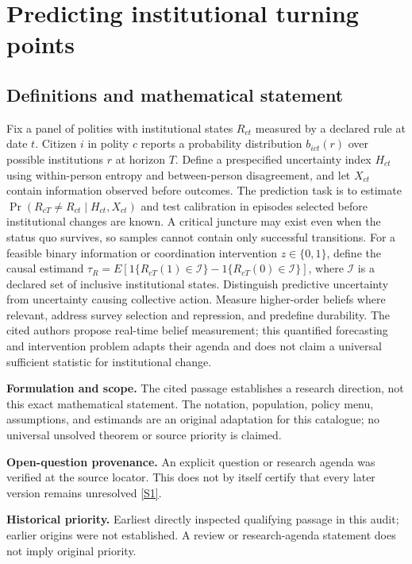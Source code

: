\documentclass[11pt]{article}
\newcommand{\sref}[2]{\hyperlink{source:#1:#2}{[S#2]}}
\begin{document}
\section*{Predicting institutional turning points}\label{30007662}
\subsection{Definitions and mathematical statement}
Fix a panel of polities with institutional states \(R_{ct}\) measured by a declared rule at date \(t\). Citizen \(i\) in polity \(c\) reports a probability distribution \(b_{ict}(r)\) over possible institutions \(r\) at horizon \(T\). Define a prespecified uncertainty index \(H_{ct}\) using within-person entropy and between-person disagreement, and let \(X_{ct}\) contain information observed before outcomes. The prediction task is to estimate \(\Pr(R_{cT}\ne R_{ct}\mid H_{ct},X_{ct})\) and test calibration in episodes selected before institutional changes are known. A critical juncture may exist even when the status quo survives, so samples cannot contain only successful transitions. For a feasible binary information or coordination intervention \(z\in\{0,1\}\), define the causal estimand \(\tau_R=E[1\{R_{cT}(1)\in\mathcal I\}-1\{R_{cT}(0)\in\mathcal I\}]\), where \(\mathcal I\) is a declared set of inclusive institutional states. Distinguish predictive uncertainty from uncertainty causing collective action. Measure higher-order beliefs where relevant, address survey selection and repression, and predefine durability. The cited authors propose real-time belief measurement; this quantified forecasting and intervention problem adapts their agenda and does not claim a universal sufficient statistic for institutional change.

\par\textbf{Formulation and scope.} The cited passage establishes a research direction, not this exact mathematical statement. The notation, population, policy menu, assumptions, and estimands are an original adaptation for this catalogue; no universal unsolved theorem or source priority is claimed.

\par\textbf{Open-question provenance.} An explicit question or research agenda was verified at the source locator. This does not by itself certify that every later version remains unresolved \sref{30007662}{1}.

\par\textbf{Historical priority.} Earliest directly inspected qualifying passage in this audit; earlier origins were not established. A review or research-agenda statement does not imply original priority.
\end{document}
